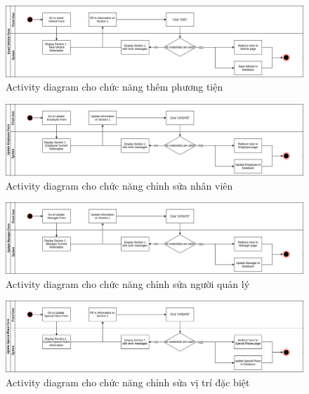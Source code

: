 \documentclass[a4paper]{article}
\begin{document}
\begin{figure}[!h]
    \includegraphics[width=14.7cm]{ActivityDiagram/AddVehicle}
    \centering
    \caption{Activity diagram cho chức năng thêm phương tiện}
    \label{fig:activity_add_vehicle}
\end{figure}
\begin{figure}[!h]
    \includegraphics[width=14.7cm]{ActivityDiagram/EditEmployee}
    \centering
    \caption{Activity diagram cho chức năng chỉnh sửa nhân viên}
    \label{fig:activity_edit_employee}
\end{figure}
\begin{figure}[!h]
    \includegraphics[width=14.7cm]{ActivityDiagram/EditManager}
    \centering
    \caption{Activity diagram cho chức năng chỉnh sửa người quản lý}
    \label{fig:activity_edit_manager}
\end{figure}
\begin{figure}[!h]
    \includegraphics[width=14.7cm]{ActivityDiagram/EditSpecialPlace}
    \centering
    \caption{Activity diagram cho chức năng chỉnh sửa vị trí đặc biệt}
    \label{fig:activity_edit_special_place}
\end{figure}
\end{document}
